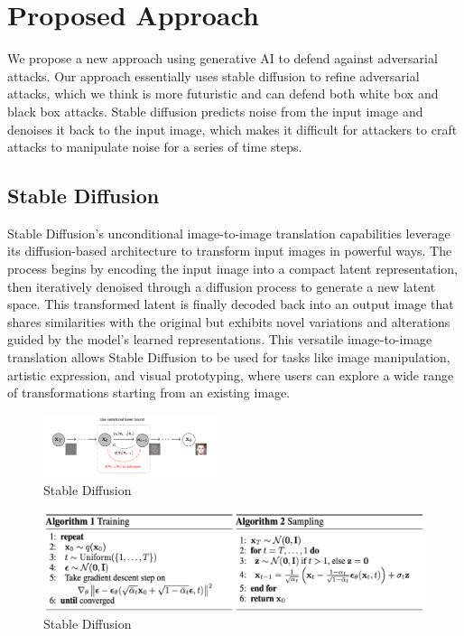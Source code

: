 \documentclass[letterpaper,twocolumn,10pt]{article}
\begin{document}
\section{Proposed Approach}

We propose a new approach using generative AI to defend against adversarial attacks. Our approach essentially uses stable diffusion to refine adversarial attacks, which we think is more futuristic and can defend both white box and black box attacks. Stable diffusion predicts noise from the input image and denoises it back to the input image, which makes it difficult for attackers to craft attacks to manipulate noise for a series of time steps.


\subsection{Stable Diffusion}

Stable Diffusion's \cite{stableDiffusion} unconditional image-to-image translation capabilities leverage its diffusion-based architecture to transform input images in powerful ways. The process begins by encoding the input image into a compact latent representation, then iteratively denoised through a diffusion process to generate a new latent space. This transformed latent is finally decoded back into an output image that shares similarities with the original but exhibits novel variations and alterations guided by the model's learned representations. This versatile image-to-image translation allows Stable Diffusion to be used for tasks like image manipulation, artistic expression, and visual prototyping, where users can explore a wide range of transformations starting from an existing image.

    \begin{figure}[htbp]
      \centering
      \includegraphics[width=0.45\textwidth]{sd.png}
      \caption{Stable Diffusion}
      \label{fig:sd}
    \end{figure}

    \begin{figure}[htbp]
      \centering
      \includegraphics[width=1\textwidth]{sda.png}
      \caption{Stable Diffusion}
      \label{fig:sda}
    \end{figure}
\end{document}
